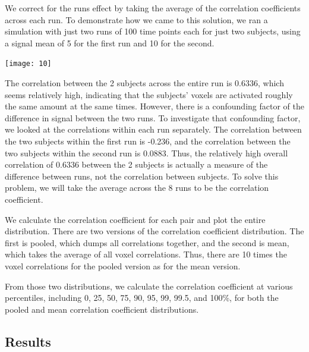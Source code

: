\documentclass[11pt]{article}
\begin{document}
We correct for the runs effect by taking the average of the correlation 
coefficients across each run.  To demonstrate how we came to this solution, 
we ran a simulation with just two runs of 100 time points each for just two 
subjects, using a signal mean of 5 for the first run and 10 for the second.  
\begin{center}                                                                  
\texttt{[image: 10]} 
\end{center}  
The correlation between the 2 subjects across the entire run is 0.6336, which
seems relatively high, indicating that the subjects' voxels are activated 
roughly the same amount at the same times.  However, there is a confounding
factor of the difference in signal between the two runs.  To investigate that
confounding factor, we looked at the correlations within each run separately.  
The correlation between the two subjects within the first run is -0.236, and 
the correlation between the two subjects within the second run is 0.0883.  
Thus, the relatively high overall correlation of 0.6336 between the 2 subjects 
is actually a measure of the difference between runs, not the correlation 
between subjects.  To solve this problem, we will take the average across the 8
runs to be the correlation coefficient.

We calculate the correlation coefficient for each pair and plot the entire
distribution.  There are two versions of the correlation coefficient 
distribution.  The first is pooled, which dumps all correlations together, 
and the second is mean, which takes the average of all voxel correlations.  
Thus, there are 10 times the voxel correlations for the pooled version as for 
the mean version.

From those two distributions, we calculate the correlation coefficient at
various percentiles, including 0, 25, 50, 75, 90, 95, 99, 99.5, and 100\%,
for both the pooled and mean correlation coefficient distributions.

\subsection{Results}
\end{document}
